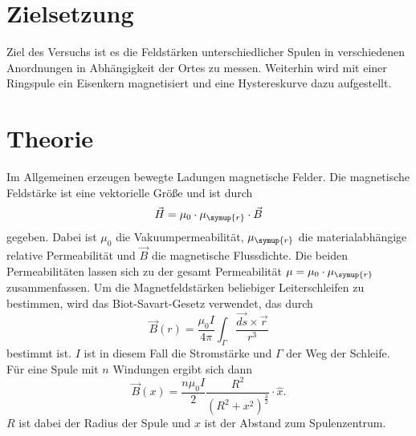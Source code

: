 \section{Zielsetzung}
\label{sec:Zielsetzung}
Ziel des Versuchs ist es die Feldstärken unterschiedlicher Spulen in verschiedenen Anordnungen in
Abhängigkeit der Ortes zu messen. Weiterhin wird mit einer Ringspule ein Eisenkern magnetisiert und eine
Hystereskurve dazu aufgestellt.

\section{Theorie}
\label{sec:Theorie}
Im Allgemeinen erzeugen bewegte Ladungen magnetische Felder. Die magnetische Feldstärke ist eine vektorielle Größe
und ist durch
\begin{equation}
    \label{eqn:magFeldstaerke}
    \vec{H} = \mu_{0}\cdot\mu_{\symup{r}}\cdot \vec{B}
\end{equation}
gegeben. Dabei ist $\mu_{0}$ die Vakuumpermeabilität, $\mu_{\symup{r}}$ die materialabhängige relative
Permeabilität und $\vec{B}$ die magnetische Flussdichte. Die beiden Permeabilitäten lassen sich zu der gesamt
Permeabilität $\mu = \mu_0 \cdot \mu_{\symup{r}}$ zusammenfassen. Um die Magnetfeldstärken beliebiger
Leiterschleifen zu bestimmen, wird das Biot-Savart-Gesetz verwendet, das durch
\begin{equation}
    \label{eqn:biotsavart}
    \vec{B}(r) = \frac{\mu_{0}I}{4\pi} \int_{\Gamma} \frac{\vec{ds}\times \vec{r}}{r^3}
\end{equation}
bestimmt ist. $I$ ist in diesem Fall die Stromstärke und $\Gamma$ der Weg der Schleife. Für eine Spule mit
$n$ Windungen ergibt sich dann
\begin{equation}
    \label{eqn:nspule}
    \vec{B}(x) = \frac{n \mu_0 I}{2} \frac{R^2}{(R^2 + x^2)^{\frac{3}{2}}} \cdot \hat{x}.
\end{equation}
$R$ ist dabei der Radius der Spule und $x$ ist der Abstand zum Spulenzentrum.
\cite{sample}
